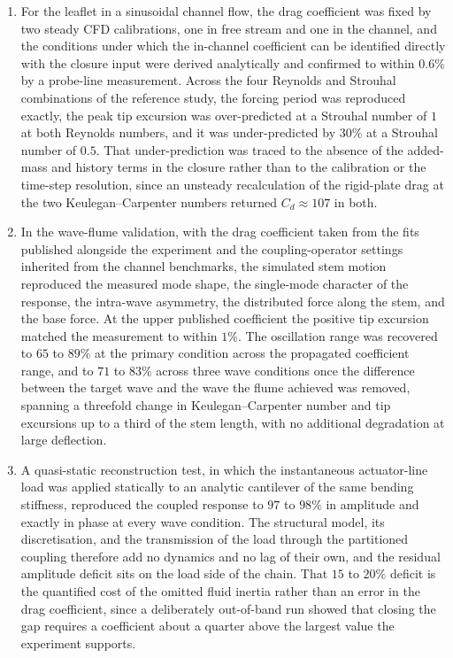 \begin{enumerate}[leftmargin=*]
\item For the leaflet in a sinusoidal channel flow, the drag coefficient was fixed by two steady CFD calibrations, one in free stream and one in the channel, and the conditions under which the in-channel coefficient can be identified directly with the closure input were derived analytically and confirmed to within $0.6\%$ by a probe-line measurement. Across the four Reynolds and Strouhal combinations of the reference study, the forcing period was reproduced exactly, the peak tip excursion was over-predicted at a Strouhal number of $1$ at both Reynolds numbers, and it was under-predicted by $30\%$ at a Strouhal number of $0.5$. That under-prediction was traced to the absence of the added-mass and history terms in the closure rather than to the calibration or the time-step resolution, since an unsteady recalculation of the rigid-plate drag at the two Keulegan--Carpenter numbers returned $C_{d} \approx 107$ in both.

\item In the wave-flume validation, with the drag coefficient taken from the fits published alongside the experiment and the coupling-operator settings inherited from the channel benchmarks, the simulated stem motion reproduced the measured mode shape, the single-mode character of the response, the intra-wave asymmetry, the distributed force along the stem, and the base force. At the upper published coefficient the positive tip excursion matched the measurement to within $1\%$. The oscillation range was recovered to $65$ to $89\%$ at the primary condition across the propagated coefficient range, and to $71$ to $83\%$ across three wave conditions once the difference between the target wave and the wave the flume achieved was removed, spanning a threefold change in Keulegan--Carpenter number and tip excursions up to a third of the stem length, with no additional degradation at large deflection.

\item A quasi-static reconstruction test, in which the instantaneous actuator-line load was applied statically to an analytic cantilever of the same bending stiffness, reproduced the coupled response to $97$ to $98\%$ in amplitude and exactly in phase at every wave condition. The structural model, its discretisation, and the transmission of the load through the partitioned coupling therefore add no dynamics and no lag of their own, and the residual amplitude deficit sits on the load side of the chain. That $15$ to $20\%$ deficit is the quantified cost of the omitted fluid inertia rather than an error in the drag coefficient, since a deliberately out-of-band run showed that closing the gap requires a coefficient about a quarter above the largest value the experiment supports.

\end{enumerate}


